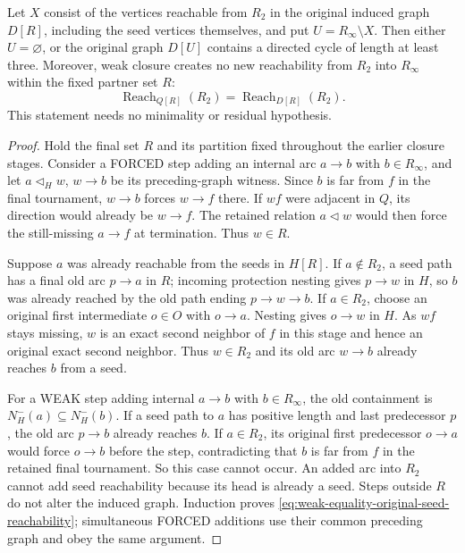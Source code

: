 \begin{theorem}
\label{thm:weak-equality-original-partner-path-cycle}
Let $X$ consist of the vertices reachable from $R_2$ in the original
induced graph $D[R]$, including the seed vertices themselves, and put
$U=R_\infty\setminus X$. Then either $U=\varnothing$, or the original
graph $D[U]$ contains a directed cycle of length at least three.
Moreover, weak closure creates no new reachability from $R_2$ into
$R_\infty$ within the fixed partner set $R$:
\[
 \operatorname{Reach}_{Q[R]}(R_2)
   =\operatorname{Reach}_{D[R]}(R_2).
 \tag{WP2}\label{eq:weak-equality-original-seed-reachability}
\]
This statement needs no minimality or residual hypothesis.
\end{theorem}
\begin{proof}
Hold the final set $R$ and its partition fixed throughout the earlier
closure stages. Consider a FORCED step adding an internal arc
$a\to b$ with $b\in R_\infty$, and let
$a\triangleleft_H w$, $w\to b$ be its preceding-graph witness.
Since $b$ is far from $f$ in the final tournament, $w\to b$ forces
$w\to f$ there. If $wf$ were adjacent in $Q$, its direction would
already be $w\to f$. The retained relation $a\triangleleft w$
would then force the still-missing $a\to f$ at termination.
Thus $w\in R$.

Suppose $a$ was already reachable from the seeds in $H[R]$.
If $a\notin R_2$, a seed path has a final old arc $p\to a$ in $R$;
incoming protection nesting gives $p\to w$ in $H$, so $b$ was already
reached by the old path ending $p\to w\to b$.
If $a\in R_2$, choose an original first intermediate $o\in O$ with
$o\to a$. Nesting gives $o\to w$ in $H$. As $wf$ stays missing,
$w$ is an exact second neighbor of $f$ in this stage and hence an
original exact second neighbor. Thus $w\in R_2$ and its old arc
$w\to b$ already reaches $b$ from a seed.

For a WEAK step adding internal $a\to b$ with $b\in R_\infty$,
the old containment is $N_H^-(a)\subseteq N_H^-(b)$.
If a seed path to $a$ has positive length and last predecessor $p$,
the old arc $p\to b$ already reaches $b$. If $a\in R_2$, its original
first predecessor $o\to a$ would force $o\to b$ before the step,
contradicting that $b$ is far from $f$ in the retained final tournament.
So this case cannot occur. An added arc into $R_2$ cannot add seed
reachability because its head is already a seed. Steps outside $R$
do not alter the induced graph. Induction proves
\eqref{eq:weak-equality-original-seed-reachability}; simultaneous
FORCED additions use their common preceding graph and obey the same
argument.


\end{proof}
